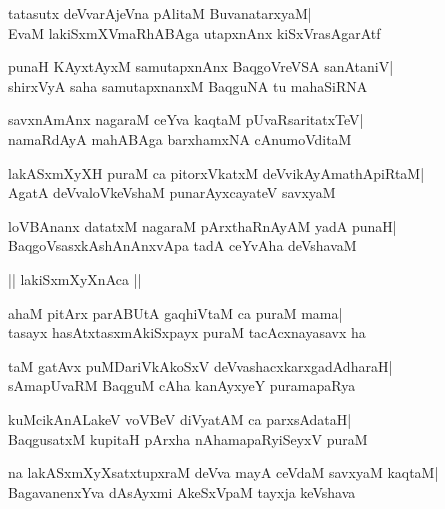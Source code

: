 \documentclass[twoside,12pt,openright]{book}
\newcounter{shloka}[chapter]
\begin{document}
\begin{shloka}%
tatasutx deVvarAjeVna pAlitaM BuvanatarxyaM|\\
EvaM lakiSxmXVmaRhABAga utapxnAnx kiSxVrasAgarAtf
\end{shloka}

\begin{shloka}%
punaH KAyxtAyxM samutapxnAnx BaqgoVreVSA sanAtaniV|\\
shirxVyA saha samutapxnanxM BaqguNA tu mahaSiRNA
\end{shloka}

\begin{shloka}%
savxnAmAnx nagaraM ceYva kaqtaM pUvaRsaritatxTeV|\\
namaRdAyA mahABAga barxhamxNA cAnumoVditaM
\end{shloka}

\begin{shloka}%
lakASxmXyXH puraM ca pitorxVkatxM deVvikAyAmathApiRtaM|\\
AgatA deVvaloVkeVshaM punarAyxcayateV savxyaM
\end{shloka}

\begin{shloka}%
loVBAnanx datatxM nagaraM pArxthaRnAyAM yadA punaH|\\
BaqgoVsasxkAshAnAnxvApa tadA ceYvAha deVshavaM
\end{shloka}

\begin{center}
|| lakiSxmXyXnAca ||
\end{center}
\begin{shloka}%
ahaM pitArx parABUtA gaqhiVtaM ca puraM mama|\\
tasayx hasAtxtasxmAkiSxpayx puraM tacAcxnayasavx ha
\end{shloka}

\begin{shloka}%
taM gatAvx puMDariVkAkoSxV deVvashacxkarxgadAdharaH|\\
sAmapUvaRM BaqguM cAha kanAyxyeY puramapaRya
\end{shloka}

\begin{shloka}%
kuMcikAnALakeV voVBeV diVyatAM ca parxsAdataH|\\
BaqgusatxM kupitaH pArxha nAhamapaRyiSeyxV puraM
\end{shloka}

\begin{shloka}%
na lakASxmXyXsatxtupxraM deVva mayA ceVdaM savxyaM kaqtaM|\\
BagavanenxYva dAsAyxmi AkeSxVpaM tayxja keVshava
\end{shloka}
\end{document}
